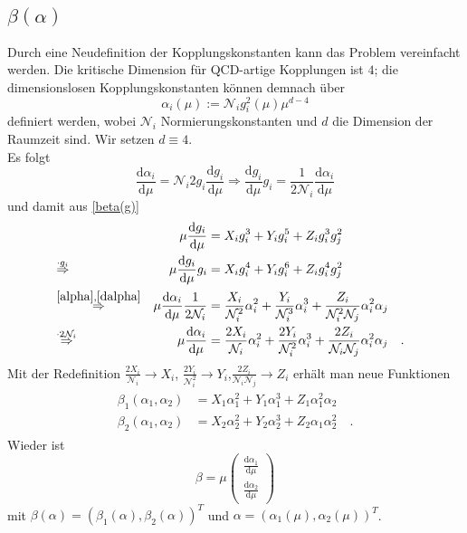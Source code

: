\documentclass{article}
\newcommand{\twopartdef}[2]
{
	\left(
		\begin{array}{ll}
			#1  \\
			#2 
		\end{array}
	\right)
}
\renewcommand{\d}{\text{d}}
\begin{document}
  \subsection{$\beta(\alpha)$}
	Durch eine Neudefinition der Kopplungskonstanten kann das Problem vereinfacht werden. Die kritische Dimension für 
	QCD-artige Kopplungen ist $4$; die dimensionslosen Kopplungskonstanten können demnach über
	\begin{equation}
	\alpha_i(\mu):= \mathcal{N}_i g_i^2(\mu) \mu^{d-4}  \label{alpha}
	\end{equation}
	definiert werden, wobei $\mathcal{N}_i$ Normierungskonstanten und $d$ die Dimension der Raumzeit sind. Wir setzen 
	$d\equiv4$.\\
	Es folgt
	\begin{equation}
	\frac{\d \alpha_i}{\d \mu}=\mathcal{N}_i 2 g_i \frac{\d g_i}{\d \mu} \Rightarrow \frac{\d g_i}{\d \mu} g_i=\frac{1}{2\mathcal{N}_i} \frac{\d \alpha_i}{\d \mu} \label{dalpha}
	\end{equation}
	und damit aus \eqref{beta(g)}
	\begin{align}
	&&\mu \frac{\d g_i}{\d \mu}&= X_i g_i^3 +Y_ig_i^5 +Z_ig_i^3 g_j^2  						 & \\
	&\overset{\cdot g_i}{\Rightarrow}&\mu \frac{\d g_i}{\d \mu} g_i &= X_i g_i^4 +Y_ig_i^6 +Z_ig_i^4 g_j^2           & \\
	&\overset{\eqref{alpha},\eqref{dalpha}}{\Rightarrow}& \mu \frac{\d \alpha_i}{\d \mu} \frac{1}{2\mathcal{N}_i} 
	    &= \frac{X_i}{\mathcal{N}_i^2} \alpha_i^2 +\frac{Y_i}{\mathcal{N}_i^3}  \alpha_i^3 +\frac{Z_i}{\mathcal{N}_i^2\mathcal{N}_j}\alpha_i^2 \alpha_j      &\\
	&\overset{\cdot 2\mathcal{N}_i}{\Rightarrow}& \mu \frac{\d \alpha_i}{\d \mu}&= \frac{2X_i}{\mathcal{N}_i} \alpha_i^2+ \frac{2Y_i}{\mathcal{N}_i^2} \alpha_i^3 +
	      \frac{2 Z_i}{\mathcal{N}_i \mathcal{N}_j} \alpha_i^2 \alpha_j \quad .
	\end{align}
	Mit der Redefinition $\frac{2X_i}{\mathcal{N}_i} \longrightarrow X_i$,
	$\frac{2Y_i}{\mathcal{N}_i^2} \longrightarrow Y_i$,$\frac{2Z_i}{\mathcal{N}_i\mathcal{N}_j} \longrightarrow Z_i$ erhält man neue Funktionen
	\begin{align}
	 \begin{aligned}
	  \beta_1(\alpha_1,\alpha_2)&=X_1\alpha_1^2 + Y_1 \alpha_1^3 + Z_1 \alpha_1^2\alpha_2 \\
	  \beta_2(\alpha_1,\alpha_2)&=X_2\alpha_2^2 + Y_2 \alpha_2^3 + Z_2 \alpha_1\alpha_2^2 \quad.
	 \end{aligned}
	\end{align}
	Wieder ist
	\begin{equation}
	\beta=\mu \twopartdef {\frac{\d \alpha_1}{\d \mu}} {\frac{\d \alpha_2}{\d \mu}} 
	\end{equation}
	mit $\beta(\alpha)=(\beta_1(\alpha),\beta_2(\alpha))^T$ und $\alpha=(\alpha_1(\mu),\alpha_2(\mu))^T$.
	
\end{document}
